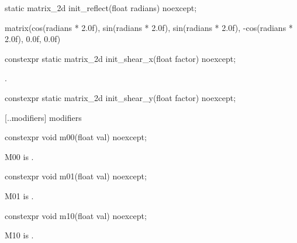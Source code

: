%
\begin{itemdecl}
static matrix_2d init_reflect(float radians) noexcept;
\end{itemdecl}
\begin{itemdescr}
\pnum
\returns
\begin{codeblock}
\end{codeblock}
matrix(cos(radians * 2.0f), sin(radians * 2.0f), sin(radians * 2.0f),
  -cos(radians * 2.0f), 0.0f, 0.0f)
\end{itemdescr}

%
\begin{itemdecl}
constexpr static matrix_2d init_shear_x(float factor) noexcept;
\end{itemdecl}
\begin{itemdescr}
\pnum
\returns
{}.
\end{itemdescr}

%
\begin{itemdecl}
constexpr static matrix_2d init_shear_y(float factor) noexcept;
\end{itemdecl}
\begin{itemdescr}
\pnum
\returns
{}
\end{itemdescr}

 [\iotwod.\matrixtwod.modifiers] { modifiers}

%
\begin{itemdecl}
constexpr void m00(float val) noexcept;
\end{itemdecl}
\begin{itemdescr}
\pnum
\effects
M00 is .
\end{itemdescr}

%
\begin{itemdecl}
constexpr void m01(float val) noexcept;
\end{itemdecl}
\begin{itemdescr}
\pnum
\effects
M01 is .
\end{itemdescr}

%
\begin{itemdecl}
constexpr void m10(float val) noexcept;
\end{itemdecl}
\begin{itemdescr}
\pnum
\effects
M10 is .
\end{itemdescr}

